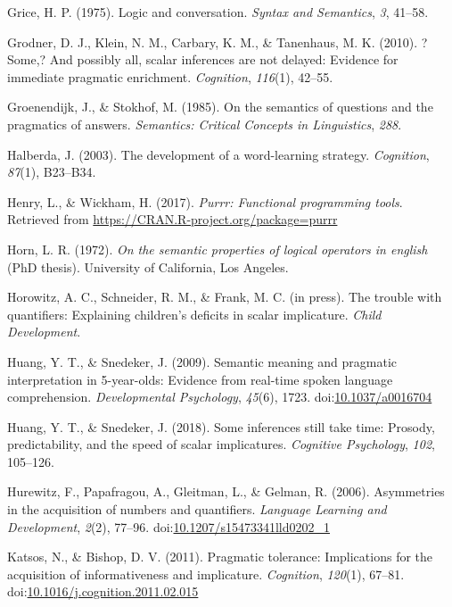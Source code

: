 \documentclass[man]{apa6}
\theoremstyle{definition}
\theoremstyle{definition}
\theoremstyle{definition}
\theoremstyle{remark}
\begin{document}
\hypertarget{ref-grice1975logic}{}
Grice, H. P. (1975). Logic and conversation. \emph{Syntax and
Semantics}, \emph{3}, 41--58.

\hypertarget{ref-grodner2010}{}
Grodner, D. J., Klein, N. M., Carbary, K. M., \& Tanenhaus, M. K.
(2010). ?Some,? And possibly all, scalar inferences are not delayed:
Evidence for immediate pragmatic enrichment. \emph{Cognition},
\emph{116}(1), 42--55.

\hypertarget{ref-groenendijk1985semantics}{}
Groenendijk, J., \& Stokhof, M. (1985). On the semantics of questions
and the pragmatics of answers. \emph{Semantics: Critical Concepts in
Linguistics}, \emph{288}.

\hypertarget{ref-halberda2003development}{}
Halberda, J. (2003). The development of a word-learning strategy.
\emph{Cognition}, \emph{87}(1), B23--B34.

\hypertarget{ref-R-purrr}{}
Henry, L., \& Wickham, H. (2017). \emph{Purrr: Functional programming
tools}. Retrieved from \url{https://CRAN.R-project.org/package=purrr}

\hypertarget{ref-horn1972}{}
Horn, L. R. (1972). \emph{On the semantic properties of logical
operators in english} (PhD thesis). University of California, Los
Angeles.

\hypertarget{ref-horowitzSchneider}{}
Horowitz, A. C., Schneider, R. M., \& Frank, M. C. (in press). The
trouble with quantifiers: Explaining children's deficits in scalar
implicature. \emph{Child Development}.

\hypertarget{ref-huang2009b}{}
Huang, Y. T., \& Snedeker, J. (2009). Semantic meaning and pragmatic
interpretation in 5-year-olds: Evidence from real-time spoken language
comprehension. \emph{Developmental Psychology}, \emph{45}(6), 1723.
doi:\href{https://doi.org/10.1037/a0016704}{10.1037/a0016704}

\hypertarget{ref-huang2018}{}
Huang, Y. T., \& Snedeker, J. (2018). Some inferences still take time:
Prosody, predictability, and the speed of scalar implicatures.
\emph{Cognitive Psychology}, \emph{102}, 105--126.

\hypertarget{ref-hurewitz2006}{}
Hurewitz, F., Papafragou, A., Gleitman, L., \& Gelman, R. (2006).
Asymmetries in the acquisition of numbers and quantifiers.
\emph{Language Learning and Development}, \emph{2}(2), 77--96.
doi:\href{https://doi.org/10.1207/s15473341lld0202_1}{10.1207/s15473341lld0202\_1}

\hypertarget{ref-katsos2011}{}
Katsos, N., \& Bishop, D. V. (2011). Pragmatic tolerance: Implications
for the acquisition of informativeness and implicature.
\emph{Cognition}, \emph{120}(1), 67--81.
doi:\href{https://doi.org/10.1016/j.cognition.2011.02.015}{10.1016/j.cognition.2011.02.015}
\end{document}
